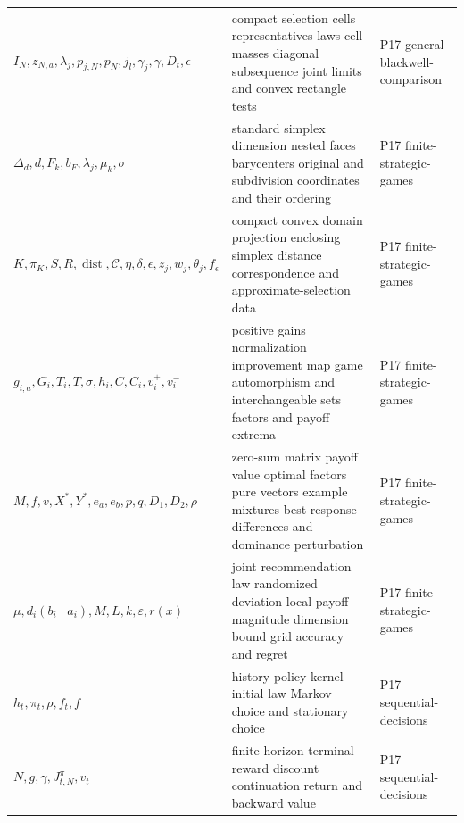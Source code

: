 \begin{longtable}{@{}p{}p{}p{}@{}}
\(I_N,\allowbreak z_{N,a},\allowbreak \lambda_j,\allowbreak p_{j,N},\allowbreak p_N,\allowbreak j_l,\allowbreak \gamma_j,\allowbreak \gamma,\allowbreak D_t,\allowbreak \epsilon\) & compact selection cells representatives laws cell masses diagonal subsequence joint limits and convex rectangle tests & P17 general-\allowbreak{}blackwell-\allowbreak{}comparison \\
\(\Delta_d,\allowbreak d,\allowbreak F_k,\allowbreak b_F,\allowbreak \lambda_j,\allowbreak \mu_k,\allowbreak \sigma\) & standard simplex dimension nested faces barycenters original and subdivision coordinates and their ordering & P17 finite-\allowbreak{}strategic-\allowbreak{}games \\
\(K,\allowbreak \pi_K,\allowbreak S,\allowbreak R,\allowbreak \operatorname{dist},\allowbreak \mathcal C,\allowbreak \eta,\allowbreak \delta,\allowbreak \epsilon,\allowbreak z_j,\allowbreak w_j,\allowbreak \theta_j,\allowbreak f_\epsilon\) & compact convex domain projection enclosing simplex distance correspondence and approximate-selection data & P17 finite-\allowbreak{}strategic-\allowbreak{}games \\
\(g_{i,a},\allowbreak G_i,\allowbreak T_i,\allowbreak T,\allowbreak \sigma,\allowbreak h_i,\allowbreak C,\allowbreak C_i,\allowbreak v_i^+,\allowbreak v_i^-\) & positive gains normalization improvement map game automorphism and interchangeable sets factors and payoff extrema & P17 finite-\allowbreak{}strategic-\allowbreak{}games \\
\(M,\allowbreak f,\allowbreak v,\allowbreak X^*,\allowbreak Y^*,\allowbreak e_a,\allowbreak e_b,\allowbreak p,\allowbreak q,\allowbreak D_1,\allowbreak D_2,\allowbreak \rho\) & zero-sum matrix payoff value optimal factors pure vectors example mixtures best-response differences and dominance perturbation & P17 finite-\allowbreak{}strategic-\allowbreak{}games \\
\(\mu,\allowbreak d_i(b_i\mid a_i),\allowbreak M,\allowbreak L,\allowbreak k,\allowbreak \varepsilon,\allowbreak r(x)\) & joint recommendation law randomized deviation local payoff magnitude dimension bound grid accuracy and regret & P17 finite-\allowbreak{}strategic-\allowbreak{}games \\
\(h_t,\allowbreak \pi_t,\allowbreak \rho,\allowbreak f_t,\allowbreak f\) & history policy kernel initial law Markov choice and stationary choice & P17 sequential-\allowbreak{}decisions \\
\(N,\allowbreak g,\allowbreak \gamma,\allowbreak J_{t,N}^{\pi},\allowbreak v_t\) & finite horizon terminal reward discount continuation return and backward value & P17 sequential-\allowbreak{}decisions \\

\end{longtable}
